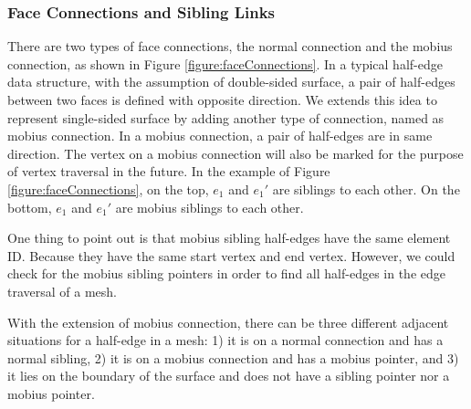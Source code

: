 \documentclass[12pt]{article}
\begin{document}
\subsubsection{Face Connections and Sibling Links}

There are two types of face connections, the normal connection and the mobius connection, as shown in Figure \ref{figure:faceConnections}. In a typical half-edge data structure, with the assumption of double-sided surface, a pair of half-edges between two faces is defined with opposite direction. We extends this idea to represent single-sided surface by adding another type of connection, named as mobius connection. In a mobius connection, a pair of half-edges are in same direction. The vertex on a mobius connection will also be marked for the purpose of vertex traversal in the future. In the example of Figure \ref{figure:faceConnections}, on the top, $e_1$ and $e_1'$ are siblings to each other. On the bottom, $e_1$ and $e_1'$ are mobius siblings to each other. 

One thing to point out is that mobius sibling half-edges have the same element ID. Because they have the same start vertex and end vertex. However, we could check for the mobius sibling pointers in order to find all half-edges in the edge traversal of a mesh.

With the extension of mobius connection, there can be three different adjacent situations for a half-edge in a mesh: 1) it is on a normal connection and has a normal sibling, 2) it is on a mobius connection and has a mobius pointer, and 3) it lies on the boundary of the surface and does not have a sibling pointer nor a mobius pointer.
\end{document}
